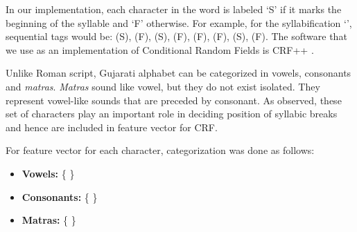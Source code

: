 \documentclass[runningheads,a4paper]{llncs}
\begin{document}
In our implementation, each character in the word is labeled `S' if it marks the beginning of the syllable and `F' otherwise. For example, for the syllabification `{}', sequential tags would be: {}(S),  {}(F), {}(S), {}(F), {}(F), {}(F), {}(S), {}(F).  The software that we use as an implementation of Conditional Random Fields is CRF++ \cite{crfpp}.

Unlike Roman script, Gujarati alphabet can be categorized in vowels, consonants and \emph{matras}. \emph{Matras} sound like vowel, but they do not exist isolated. They represent vowel-like sounds that are preceded by consonant. As observed, these set of characters play an important role in deciding position of syllabic breaks and hence are included in feature vector for CRF. 

\noindent For feature vector for each character, categorization was done as follows:
\begin{itemize} \itemsep1pt \parskip0pt 
  \item \textbf{Vowels:} \{ {}   \}
  \item \textbf{Consonants:} \{  { }\}
  \item \textbf{Matras:} \{ {} \}
\end{itemize}
\end{document}

